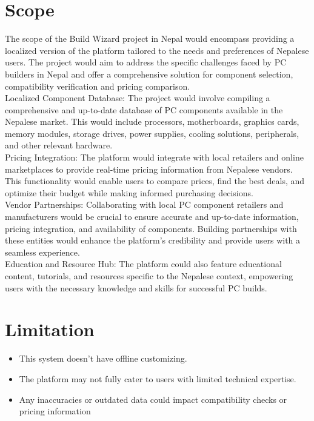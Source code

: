 \section{Scope}

The scope of the Build Wizard project in Nepal would encompass providing a localized version of the platform tailored to the needs and preferences of Nepalese users. The project would aim to address the specific challenges faced by PC builders in Nepal and offer a comprehensive solution for component selection, compatibility verification and pricing comparison.\\Localized Component Database: The project would involve compiling a comprehensive and up-to-date database of PC components available in the Nepalese market. This would include processors, motherboards, graphics cards, memory modules, storage drives, power supplies, cooling solutions, peripherals, and other relevant hardware.\\
Pricing Integration: The platform would integrate with local retailers and online marketplaces to provide real-time pricing information from Nepalese vendors. This functionality would enable users to compare prices, find the best deals, and optimize their budget while making informed purchasing decisions.\\Vendor Partnerships: Collaborating with local PC component retailers and manufacturers would be crucial to ensure accurate and up-to-date information, pricing integration, and availability of components. Building partnerships with these entities would enhance the platform's credibility and provide users with a seamless experience.\\Education and Resource Hub: The platform could also feature educational content, tutorials, and resources specific to the Nepalese context, empowering users with the necessary knowledge and skills for successful PC builds.
\section{Limitation}
\begin{itemize}
    \item This system doesn't have offline customizing.
    \item The platform may not fully cater to users with limited technical expertise.
    \item Any inaccuracies or outdated data could impact compatibility checks or pricing information
 \end{itemize}
